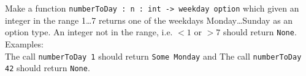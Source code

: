 Make a function \lstinline{numberToDay : n : int -> weekday option} which given an integer in the range 1\dots 7 returns one of the weekdays Monday\dots Sunday as an option type. An integer not in the range, i.e. $< 1$ or $>7$ should return \texttt{None}.
\\
Examples: \\
The call \lstinline{numberToDay 1} should return \lstinline{Some Monday} and The call \lstinline{numberToDay 42} should return \lstinline{None}.